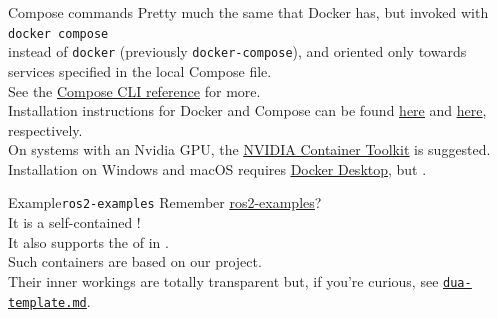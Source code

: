 \begin{frame}{Compose commands}
  \justifying
	Pretty much the same that Docker has, but invoked with\\
  \bigskip
	\texttt{docker compose}\\
  \bigskip
	instead of \texttt{docker} (previously \texttt{docker-compose}), and oriented only towards services specified in the local Compose file.\\
  \bigskip
	See the \href{https://docs.docker.com/compose/reference/}{\color{blue}\underline{Compose CLI reference}} for more.\\
  \bigskip
  Installation instructions for Docker and Compose can be found \href{https://docs.docker.com/engine/install/ubuntu/}{\color{blue}\underline{here}} and \href{https://docs.docker.com/compose/install/linux/}{\color{blue}\underline{here}}, respectively.\\
  On systems with an Nvidia GPU, the \href{https://docs.nvidia.com/datacenter/cloud-native/container-toolkit/overview.html}{\color{blue}\underline{NVIDIA Container Toolkit}} is suggested.\\
  Installation on Windows and macOS requires \href{https://www.docker.com/products/docker-desktop/}{\color{blue}\underline{Docker Desktop}}, but .
\end{frame}

\begin{frame}{Example}{\texttt{ros2-examples}}
  \justifying
  Remember \href{https://github.com/IntelligentSystemsLabUTV/ros2-examples}{\color{blue}\underline{ros2-examples}}?\\
  It is a self-contained !\\
  \bigskip
  It also supports the  of  in .\\
	Such containers are based on our \href{https://github.com/dotX-Automation/dua-template}{} project.\\
  \bigskip
	Their inner workings are totally transparent but, if you're curious, see \href{https://github.com/IntelligentSystemsLabUTV/ros2-examples/blob/jazzy/dua-template.md}{\color{blue}\underline{\texttt{dua-template.md}}}.
\end{frame}
